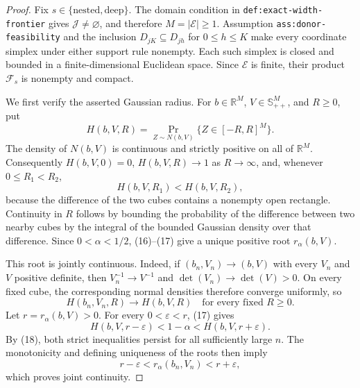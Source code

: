 \documentclass{article}
\begin{document}
\begin{proof}
Fix \(s\in\{\mathrm{nested},\mathrm{deep}\}\).  The domain condition in
\texttt{def:exact-width-frontier} gives \(\mathcal J\ne\varnothing\), and
therefore \(M=|\mathcal E|\geq1\).  Assumption
\texttt{ass:donor-feasibility} and the inclusion
\(D_{jK}\subseteq D_{jh}\) for \(0\leq h\leq K\) make every coordinate
simplex under either support rule nonempty.  Each such simplex is closed and
bounded in a finite-dimensional Euclidean space.  Since \(\mathcal E\) is
finite, their product \(\mathcal F_s\) is nonempty and compact.

We first verify the asserted Gaussian radius.  For
\(b\in\mathbb R^M\), \(V\in\mathbb S_{++}^M\), and \(R\geq0\), put
\[
 H(b,V,R)=\Pr_{Z\sim N(b,V)}\{Z\in[-R,R]^M\}. \tag{16}
\]
The density of \(N(b,V)\) is continuous and strictly positive on all of
\(\mathbb R^M\).  Consequently \(H(b,V,0)=0\),
\(H(b,V,R)\to1\) as \(R\to\infty\), and, whenever
\(0\leq R_1<R_2\),
\[
 H(b,V,R_1)<H(b,V,R_2), \tag{17}
\]
because the difference of the two cubes contains a nonempty open rectangle.
Continuity in \(R\) follows by bounding the probability of the difference
between two nearby cubes by the integral of the bounded Gaussian density over
that difference.  Since \(0<\alpha<1/2\), (16)--(17) give a unique positive
root \(r_\alpha(b,V)\).

This root is jointly continuous.  Indeed, if
\((b_n,V_n)\to(b,V)\) with every \(V_n\) and \(V\) positive definite, then
\(V_n^{-1}\to V^{-1}\) and \(\det(V_n)\to\det(V)>0\).  On every fixed cube,
the corresponding normal densities therefore converge uniformly, so
\[
 H(b_n,V_n,R)\longrightarrow H(b,V,R)
 \quad\text{for every fixed }R\geq0. \tag{18}
\]
Let \(r=r_\alpha(b,V)>0\).  For every \(0<\varepsilon<r\), (17) gives
\[
 H(b,V,r-\varepsilon)<1-\alpha<H(b,V,r+\varepsilon). \tag{19}
\]
By (18), both strict inequalities persist for all sufficiently large \(n\).
The monotonicity and defining uniqueness of the roots then imply
\[
 r-\varepsilon<r_\alpha(b_n,V_n)<r+\varepsilon, \tag{20}
\]
which proves joint continuity.


\end{proof}
\end{document}
